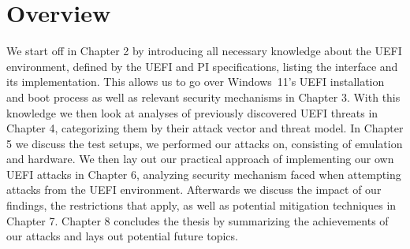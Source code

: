 \section{Overview}

We start off in Chapter 2 by introducing all necessary knowledge about the \ac{UEFI} environment, defined by the \ac{UEFI} and \ac{PI} specifications, listing the interface and its implementation.
This allows us to go over Windows~11's \ac{UEFI} installation and boot process as well as relevant security mechanisms in Chapter 3.
With this knowledge we then look at analyses of previously discovered \ac{UEFI} threats in Chapter 4, categorizing them by their attack vector and threat model.
In Chapter 5 we discuss the test setups, we performed our attacks on, consisting of emulation and hardware.
We then lay out our practical approach of implementing our own \ac{UEFI} attacks in Chapter 6, analyzing security mechanism faced when attempting attacks from the UEFI environment.
Afterwards we discuss the impact of our findings, the restrictions that apply, as well as potential mitigation techniques in Chapter 7.
Chapter 8 concludes the thesis by summarizing the achievements of our attacks and lays out potential future topics.